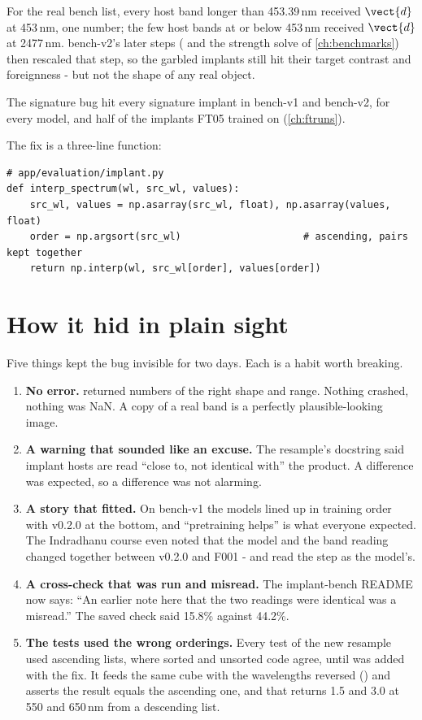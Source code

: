 For the real bench list, every host band longer than 453.39\,nm received $\vect{d}$ at 453\,nm, one number;
the few host bands at or below 453\,nm received $\vect{d}$ at 2477\,nm. bench-v2's later steps
( and the strength solve of \cref{ch:benchmarks}) then rescaled that step, so the
garbled implants still hit their target contrast and foreignness - but not the shape of any real object.

\begin{keypoint}
The signature bug hit every signature implant in bench-v1 and bench-v2, for every model, and half of the
implants FT05 trained on (\cref{ch:ftruns}).
\end{keypoint}

The fix is a three-line function:
\begin{lstlisting}
# app/evaluation/implant.py
def interp_spectrum(wl, src_wl, values):
    src_wl, values = np.asarray(src_wl, float), np.asarray(values, float)
    order = np.argsort(src_wl)                     # ascending, pairs kept together
    return np.interp(wl, src_wl[order], values[order])
\end{lstlisting}

\section{How it hid in plain sight}\label{sec:sortbug:hid}

Five things kept the bug invisible for two days. Each is a habit worth breaking.
\begin{enumerate}
\item \textbf{No error.}  returned numbers of the right shape and range. Nothing crashed,
  nothing was NaN. A copy of a real band is a perfectly plausible-looking image.
\item \textbf{A warning that sounded like an excuse.} The resample's docstring said implant hosts are read
  ``close to, not identical with'' the product. A difference was expected, so a difference was not alarming.
\item \textbf{A story that fitted.} On bench-v1 the models lined up in training order with v0.2.0 at the bottom,
  and ``pretraining helps'' is what everyone expected. The Indradhanu course even noted that the model and the
  band reading changed together between v0.2.0 and F001 - and read the step as the model's.
\item \textbf{A cross-check that was run and misread.} The implant-bench README now says: ``An earlier note here
  that the two readings were identical was a misread.'' The saved check said 15.8\% against 44.2\%.
\item \textbf{The tests used the wrong orderings.} Every test of the new resample used ascending lists, where
  sorted and unsorted code agree, until  was added with the fix. It feeds the
  same cube with the wavelengths reversed () and asserts the result equals the ascending one,
  and that  returns 1.5 and 3.0 at 550 and 650\,nm from a descending list.
\end{enumerate}

